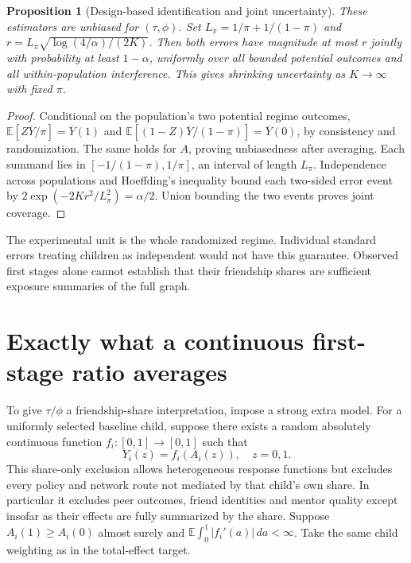 \documentclass[11pt]{article}
\newtheorem{proposition}[theorem]{Proposition}
\theoremstyle{remark}\newtheorem{remark}[theorem]{Remark}
\newcommand{\E}{\mathbb E}
\begin{document}
\begin{proposition}[Design-based identification and joint uncertainty]\label{trial}
These estimators are unbiased for $(\tau,\phi)$. Set
$L_\pi=1/\pi+1/(1-\pi)$ and
$r= L_\pi\sqrt{\log(4/\alpha)/(2K)}$.
Then both errors have magnitude at most $r$ jointly with probability at least $1-\alpha$, uniformly over all bounded potential outcomes and all within-population interference. This gives shrinking uncertainty as $K\to\infty$ with fixed $\pi$.
\end{proposition}
\begin{proof}
Conditional on the population's two potential regime outcomes,
$\E[Z\overline Y/\pi]=\overline Y(1)$ and
$\E[(1-Z)\overline Y/(1-\pi)]=\overline Y(0)$, by consistency and randomization. The same holds for $A$, proving unbiasedness after averaging. Each summand lies in $[-1/(1-\pi),1/\pi]$, an interval of length $L_\pi$. Independence across populations and Hoeffding's inequality bound each two-sided error event by $2\exp(-2Kr^2/L_\pi^2)=\alpha/2$. Union bounding the two events proves joint coverage.
\end{proof}

The experimental unit is the whole randomized regime. Individual standard errors treating children as independent would not have this guarantee. Observed first stages alone cannot establish that their friendship shares are sufficient exposure summaries of the full graph.

\section{Exactly what a continuous first-stage ratio averages}
To give $\tau/\phi$ a friendship-share interpretation, impose a strong extra model. For a uniformly selected baseline child, suppose there exists a random absolutely continuous function $f_i:[0,1]\to[0,1]$ such that
\[
 Y_i(z)=f_i(A_i(z)),\quad z=0,1.\tag{E}
\]
This share-only exclusion allows heterogeneous response functions but excludes every policy and network route not mediated by that child's own share. In particular it excludes peer outcomes, friend identities and mentor quality except insofar as their effects are fully summarized by the share. Suppose $A_i(1)\geq A_i(0)$ almost surely and
$\E\int_0^1|f_i'(a)|\,da<\infty$. Take the same child weighting as in the total-effect target.
\end{document}
